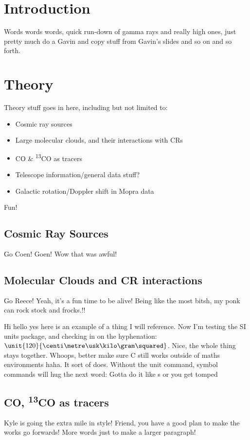 \documentclass[a4paper, titlepage, oneside]{article}
\newcommand{\elem}[2]{\textsuperscript{#1}{#2}}
\begin{document}
\begin{multicols}{2}
\section{Introduction}
Words words words, quick run-down of gamma rays and really high ones, just pretty much do a Gavin and copy stuff from Gavin's slides and so on and so forth.

\section{Theory}
Theory stuff goes in here, including but not limited to:
\begin{itemize}
\item Cosmic ray sources
\item Large molecular clouds, and their interactions with CRs
\item CO \& \elem{13}{CO} as tracers
\item Telescope information/general data stuff?
\item Galactic rotation/Doppler shift in Mopra data
\end{itemize}
Fun!

\subsection{Cosmic Ray Sources}
Go Coen! Goen! Wow that was awful!

\subsection{Molecular Clouds and CR interactions}
Go Reece!  Yeah, it's a fun time to be alive! Being like the most bitsh, my ponk can rock stock and frocks.!!

Hi hello yes here is an example of a thing I will reference. \parencite{rmp1} Now I'm testing the SI units package, and checking in on the hyphenation: \(\unit{120}{\centi\metre\usk\kilo\gram\squared}\). Nice, the whole thing stays together. Whoops, better make sure \degree C still works outside of maths environments haha. It sort of does. Without the unit command, symbol commands will hug the next word: Gotta do it like \unit{\second} or you get \second tomped

\subsection{CO, \elem{13}{CO} as tracers}
Kyle is going the extra mile in style! Friend, you have a good plan to make the works go forwards! More words just to make a larger paragraph!


\end{multicols}
\end{document}
